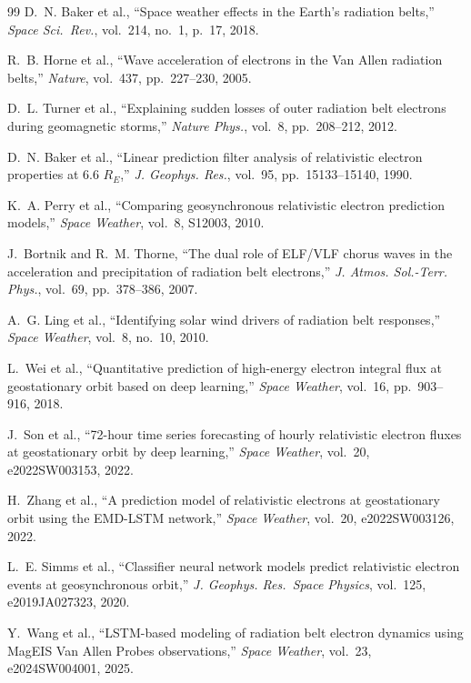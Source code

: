 ﻿\documentclass{ieeeaccess}
\begin{document}
\begin{thebibliography}{99}
D.~N. Baker et al., ``Space weather effects in the Earth's radiation belts,''
\emph{Space Sci.\ Rev.}, vol.~214, no.~1, p.~17, 2018.

R.~B. Horne et al., ``Wave acceleration of electrons in the Van Allen
radiation belts,'' \emph{Nature}, vol.~437, pp.~227--230, 2005.

D.~L. Turner et al., ``Explaining sudden losses of outer radiation belt
electrons during geomagnetic storms,'' \emph{Nature Phys.}, vol.~8,
pp.~208--212, 2012.

D.~N. Baker et al., ``Linear prediction filter analysis of relativistic
electron properties at 6.6 \(R_E\),'' \emph{J. Geophys. Res.}, vol.~95,
pp.~15133--15140, 1990.

K.~A. Perry et al., ``Comparing geosynchronous relativistic electron
prediction models,'' \emph{Space Weather}, vol.~8, S12003, 2010.

J.~Bortnik and R.~M. Thorne, ``The dual role of ELF/VLF chorus waves in
the acceleration and precipitation of radiation belt electrons,''
\emph{J. Atmos. Sol.-Terr. Phys.}, vol.~69, pp.~378--386, 2007.

A.~G. Ling et al., ``Identifying solar wind drivers of radiation belt
responses,'' \emph{Space Weather}, vol.~8, no.~10, 2010.

L.~Wei et al., ``Quantitative prediction of high-energy electron integral
flux at geostationary orbit based on deep learning,'' \emph{Space Weather},
vol.~16, pp.~903--916, 2018.

J.~Son et al., ``72-hour time series forecasting of hourly relativistic
electron fluxes at geostationary orbit by deep learning,''
\emph{Space Weather}, vol.~20, e2022SW003153, 2022.

H.~Zhang et al., ``A prediction model of relativistic electrons at
geostationary orbit using the EMD-LSTM network,'' \emph{Space Weather},
vol.~20, e2022SW003126, 2022.

L.~E. Simms et al., ``Classifier neural network models predict relativistic
electron events at geosynchronous orbit,'' \emph{J. Geophys. Res.\
Space Physics}, vol.~125, e2019JA027323, 2020.

Y.~Wang et al., ``LSTM-based modeling of radiation belt electron dynamics
using MagEIS Van Allen Probes observations,'' \emph{Space Weather}, vol.~23,
e2024SW004001, 2025.


\end{thebibliography}
\end{document}
